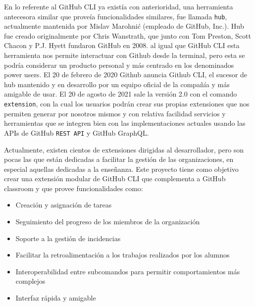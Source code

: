 En lo referente al GitHub CLI ya existía con anterioridad, una herramienta antecesora similar que proveía funcionalidades similares, fue  llamada \verb|hub|, actualmente mantenida por Mislav Marohnić (empleado de GitHub, Inc.). Hub fue creado originalmente por Chris Wanstrath, que junto con Tom Preston, Scott Chacon y P.J. Hyett fundaron GitHub en 2008. al igual que GitHub CLI esta herramienta nos permite interactuar con Github desde la terminal, pero esta se podría considerar un producto personal y más centrado en los denominados \gls{power users}. El 20 de febrero de 2020 Github anuncia Github CLI, el sucesor de hub mantenido y en desarrollo por un equipo oficial de la compañía y más amigable de usar. El 20 de agosto de 2021 sale la versión 2.0 con el comando \verb|extension|\cite{gh-extension}, con la cual los usuarios podrán crear sus propias extensiones que nos permiten generar por nosotros mismos y con relativa facilidad servicios y herramientas que se integren bien con las implementaciones actuales usando  las \gls{API}s de GitHub \verb|REST API|\cite{github-rest-api} y GitHub GraphQL\cite{github-graphql}.

Actualmente, existen cientos de extensiones dirigidas al desarrollador, pero son pocas las que están dedicadas a facilitar la gestión de las organizaciones, en especial aquellas dedicadas a la enseñanza. Este proyecto tiene como objetivo crear una extensión modular de GitHub CLI que complementa a GitHub classroom y que provee funcionalidades como:

\begin{itemize}
    \item Creación y asignación de tareas
    \item Seguimiento del progreso de los miembros de la organización
    \item Soporte a la gestión de incidencias
    \item Facilitar la retroalimentación a los trabajos realizados por los alumnos
    \item Interoperabilidad entre subcomandos para permitir comportamientos más complejos
    \item Interfaz rápida y amigable
\end{itemize}